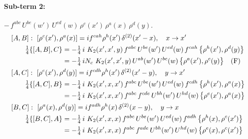 \documentclass[10pt]{article}
\numberwithin{equation}{section}
\begin{document}
\paragraph{Sub-term 2:} $-\,f^{abc}\,U^{be}(w')\,U^{ed}(w)\,\rho^{c}(x')\,\rho^{a}(x)\,\rho^{d}(y)$.
\begin{align}
&[A,B]:\ [\rho^{c}(x'),\rho^{a}(x)]=i f^{cah}\rho^{h}(x')\,\delta^{(2)}(x'-x),\quad x\to x'\notag\\
&\qquad \tfrac14\{[A,B],C\}=-\tfrac14\,i\,\,K_2(x',x',y)\,f^{abc}\,U^{be}(w')\,U^{ed}(w)\,f^{cah}\,\big\{\rho^{h}(x'),\rho^{d}(y)\big\}\notag\\
&\qquad\phantom{\tfrac14\{[A,B],C\}}=-\tfrac14\,i N_{c}\,\,K_2(x',x',y)\,U^{ab}(w')\,U^{bc}(w)\,\big\{\rho^{a}(x'),\rho^{c}(y)\big\}\quad\text{(F)}
\label{eq:A2-2-AB}\\
&[A,C]:\ [\rho^{c}(x'),\rho^{d}(y)]=i f^{cdh}\rho^{h}(x')\,\delta^{(2)}(x'-y),\quad y\to x'\notag\\
&\qquad \tfrac14\{[A,C],B\}=-\tfrac14\,i\,\,K_2(x',x,x')\,f^{abc}\,U^{be}(w')\,U^{ed}(w)\,f^{cdh}\,\big\{\rho^{h}(x'),\rho^{a}(x)\big\}\notag\\
&\qquad\phantom{\tfrac14\{[A,C],B\}}=-\tfrac14\,i\,\,K_2(x',x,x')\,f^{abc}\,f^{cde}\,U^{bh}(w')\,U^{hd}(w)\,\big\{\rho^{e}(x'),\rho^{a}(x)\big\}
\label{eq:A2-2-AC}\\
&[B,C]:\ [\rho^{a}(x),\rho^{d}(y)]=i f^{adh}\rho^{h}(x)\,\delta^{(2)}(x-y),\quad y\to x\notag\\
&\qquad \tfrac14\{[B,C],A\}=-\tfrac14\,i\,\,K_2(x',x,x)\,f^{abc}\,U^{be}(w')\,U^{ed}(w)\,f^{adh}\,\big\{\rho^{h}(x),\rho^{c}(x')\big\}\notag\\
&\qquad\phantom{\tfrac14\{[B,C],A\}}=-\tfrac14\,i\,\,K_2(x',x,x)\,f^{abc}\,f^{ade}\,U^{bh}(w')\,U^{hd}(w)\,\big\{\rho^{e}(x),\rho^{c}(x')\big\}
\label{eq:A2-2-BC}
\end{align}
\end{document}
